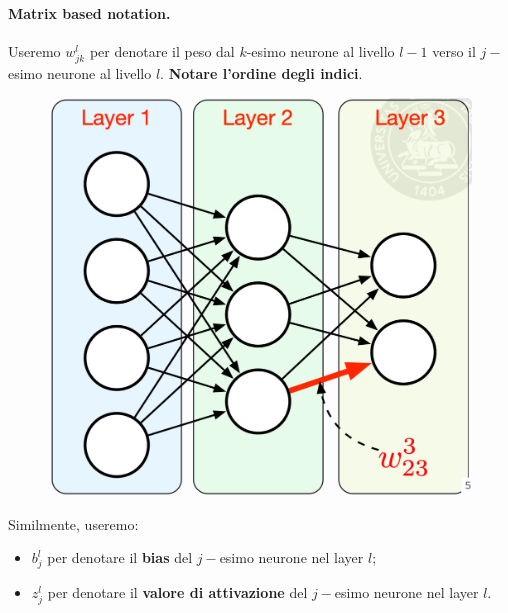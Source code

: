 \paragraph{Matrix based notation.} Useremo $w^l_{jk}$ per denotare il peso dal $k$-esimo neurone al livello $l-1$ verso il $j-$esimo neurone al livello $l$. \textbf{Notare l'ordine degli indici}.
\begin{figure}[!h]
    \includegraphics[scale=.33]{images/backpropagation/matrixNotation01.png}
    \centering
\end{figure}
\newpage
Similmente, useremo:
\begin{itemize}
    \item $b_j^l$ per denotare il \textbf{bias} del $j-$esimo neurone nel layer $l$;
    \item $z_j^l$ per denotare il \textbf{valore di attivazione} del $j-$esimo neurone nel layer $l$.
\end{itemize}
